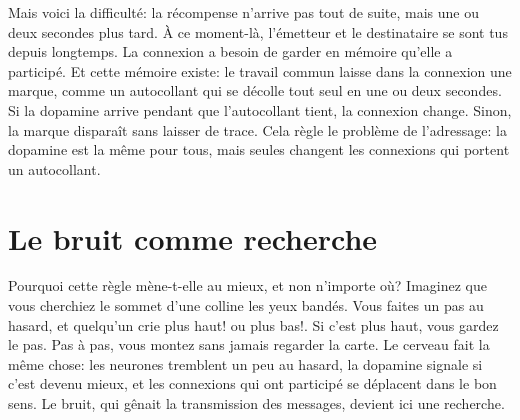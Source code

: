 
Mais voici la difficulté: la récompense n'arrive pas tout de suite, mais une ou deux secondes plus tard. À ce moment-là, l'émetteur et le destinataire se sont tus depuis longtemps. La connexion a besoin de garder en mémoire qu'elle a participé. Et cette mémoire existe: le travail commun laisse dans la connexion une marque, comme un autocollant qui se décolle tout seul en une ou deux secondes. Si la dopamine arrive pendant que l'autocollant tient, la connexion change. Sinon, la marque disparaît sans laisser de trace. Cela règle le problème de l'adressage: la dopamine est la même pour tous, mais seules changent les connexions qui portent un autocollant.


\section*{Le bruit comme recherche}

Pourquoi cette règle mène-t-elle au mieux, et non n'importe où? Imaginez que vous cherchiez le sommet d'une colline les yeux bandés. Vous faites un pas au hasard, et quelqu'un crie \og plus haut!\fg{} ou \og plus bas!\fg{}. Si c'est \og plus haut\fg{}, vous gardez le pas. Pas à pas, vous montez sans jamais regarder la carte. Le cerveau fait la même chose: les neurones tremblent un peu au hasard, la dopamine signale si c'est devenu mieux, et les connexions qui ont participé se déplacent dans le bon sens. Le bruit, qui gênait la transmission des messages, devient ici une recherche.

